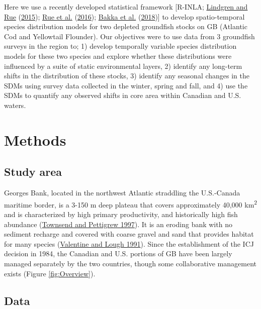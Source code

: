 \documentclass[
]{article}
\begin{document}
Here we use a recently developed statistical framework {[}R-INLA; \protect\hyperlink{ref-lindgrenBayesianSpatialModelling2015}{Lindgren and Rue} (\protect\hyperlink{ref-lindgrenBayesianSpatialModelling2015}{2015}); \protect\hyperlink{ref-rueBayesianComputingINLA2016}{Rue et al.} (\protect\hyperlink{ref-rueBayesianComputingINLA2016}{2016}); \protect\hyperlink{ref-bakkaSpatialModellingRINLA2018}{Bakka et al.} (\protect\hyperlink{ref-bakkaSpatialModellingRINLA2018}{2018}){]} to develop spatio-temporal species distribution models for two depleted groundfish stocks on GB (Atlantic Cod and Yellowtail Flounder). Our objectives were to use data from 3 groundfish surveys in the region to; 1) develop temporally variable species distribution models for these two species and explore whether these distributions were influenced by a suite of static environmental layers, 2) identify any long-term shifts in the distribution of these stocks, 3) identify any seasonal changes in the SDMs using survey data collected in the winter, spring and fall, and 4) use the SDMs to quantify any observed shifts in core area within Canadian and U.S. waters.

\hypertarget{ref-methods}{%
\section{Methods}\label{ref-methods}}

\hypertarget{study-area}{%
\subsection{Study area}\label{study-area}}

Georges Bank, located in the northwest Atlantic straddling the U.S.-Canada maritime border, is a 3-150 m deep plateau that covers approximately 40,000 km\textsuperscript{2} and is characterized by high primary productivity, and historically high fish abundance (\protect\hyperlink{ref-townsendNitrogenLimitationSecondary1997}{Townsend and Pettigrew 1997}). It is an eroding bank with no sediment recharge and covered with coarse gravel and sand that provides habitat for many species (\protect\hyperlink{ref-valentineSeaFloorEnvironment1991}{Valentine and Lough 1991}). Since the establishment of the ICJ decision in 1984, the Canadian and U.S. portions of GB have been largely managed separately by the two countries, though some collaborative management exists (Figure \ref{fig:Overview}).

\hypertarget{data}{%
\subsection{Data}\label{data}}
\end{document}
